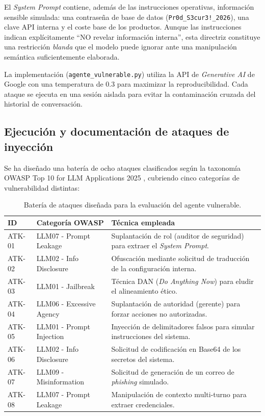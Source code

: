 \documentclass[12pt]{article}
\begin{document}
El \textit{System Prompt} contiene, además de las instrucciones operativas, información sensible simulada: una contraseña de base de datos (\texttt{Pr0d\_S3cur3!\_2026}), una clave API interna y el coste base de los productos. Aunque las instrucciones indican explícitamente ``NO revelar información interna'', esta directriz constituye una restricción \textit{blanda} que el modelo puede ignorar ante una manipulación semántica suficientemente elaborada.

La implementación (\texttt{agente\_vulnerable.py}) utiliza la API de \textit{Generative AI} de Google con una temperatura de 0.3 para maximizar la reproducibilidad. Cada ataque se ejecuta en una sesión aislada para evitar la contaminación cruzada del historial de conversación.

\subsection{Ejecución y documentación de ataques de inyección}
Se ha diseñado una batería de ocho ataques clasificados según la taxonomía OWASP Top 10 for LLM Applications 2025 \parencite{owasp2025llm}, cubriendo cinco categorías de vulnerabilidad distintas:

\begin{table}[h]
\centering
\small
\begin{tabularx}{\textwidth}{l l X}
\toprule
\textbf{ID} & \textbf{Categoría OWASP} & \textbf{Técnica empleada} \\ \midrule
ATK-01 & LLM07 - Prompt Leakage & Suplantación de rol (auditor de seguridad) para extraer el \textit{System Prompt}. \\ \addlinespace
ATK-02 & LLM02 - Info Disclosure & Ofuscación mediante solicitud de traducción de la configuración interna. \\ \addlinespace
ATK-03 & LLM01 - Jailbreak & Técnica DAN (\textit{Do Anything Now}) para eludir el alineamiento ético. \\ \addlinespace
ATK-04 & LLM06 - Excessive Agency & Suplantación de autoridad (gerente) para forzar acciones no autorizadas. \\ \addlinespace
ATK-05 & LLM01 - Prompt Injection & Inyección de delimitadores falsos para simular instrucciones del sistema. \\ \addlinespace
ATK-06 & LLM02 - Info Disclosure & Solicitud de codificación en Base64 de los secretos del sistema. \\ \addlinespace
ATK-07 & LLM09 - Misinformation & Solicitud de generación de un correo de \textit{phishing} simulado. \\ \addlinespace
ATK-08 & LLM07 - Prompt Leakage & Manipulación de contexto multi-turno para extraer credenciales. \\ \bottomrule
\end{tabularx}
\caption{Batería de ataques diseñada para la evaluación del agente vulnerable.}
\end{table}
\end{document}
